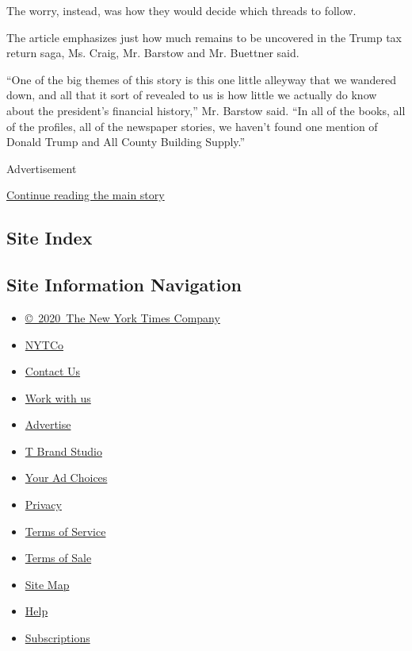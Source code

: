The worry, instead, was how they would decide which threads to follow.

The article emphasizes just how much remains to be uncovered in the
Trump tax return saga, Ms. Craig, Mr. Barstow and Mr. Buettner said.

``One of the big themes of this story is this one little alleyway that
we wandered down, and all that it sort of revealed to us is how little
we actually do know about the president's financial history,'' Mr.
Barstow said. ``In all of the books, all of the profiles, all of the
newspaper stories, we haven't found one mention of Donald Trump and All
County Building Supply.''

Advertisement

\protect\hyperlink{after-bottom}{Continue reading the main story}

\hypertarget{site-index}{%
\subsection{Site Index}\label{site-index}}

\hypertarget{site-information-navigation}{%
\subsection{Site Information
Navigation}\label{site-information-navigation}}

\begin{itemize}
\tightlist
\item
  \href{https://help.nytimes3xbfgragh.onion/hc/en-us/articles/115014792127-Copyright-notice}{©~2020~The
  New York Times Company}
\end{itemize}

\begin{itemize}
\tightlist
\item
  \href{https://www.nytco.com/}{NYTCo}
\item
  \href{https://help.nytimes3xbfgragh.onion/hc/en-us/articles/115015385887-Contact-Us}{Contact
  Us}
\item
  \href{https://www.nytco.com/careers/}{Work with us}
\item
  \href{https://nytmediakit.com/}{Advertise}
\item
  \href{http://www.tbrandstudio.com/}{T Brand Studio}
\item
  \href{https://www.nytimes3xbfgragh.onion/privacy/cookie-policy\#how-do-i-manage-trackers}{Your
  Ad Choices}
\item
  \href{https://www.nytimes3xbfgragh.onion/privacy}{Privacy}
\item
  \href{https://help.nytimes3xbfgragh.onion/hc/en-us/articles/115014893428-Terms-of-service}{Terms
  of Service}
\item
  \href{https://help.nytimes3xbfgragh.onion/hc/en-us/articles/115014893968-Terms-of-sale}{Terms
  of Sale}
\item
  \href{https://spiderbites.nytimes3xbfgragh.onion}{Site Map}
\item
  \href{https://help.nytimes3xbfgragh.onion/hc/en-us}{Help}
\item
  \href{https://www.nytimes3xbfgragh.onion/subscription?campaignId=37WXW}{Subscriptions}
\end{itemize}
